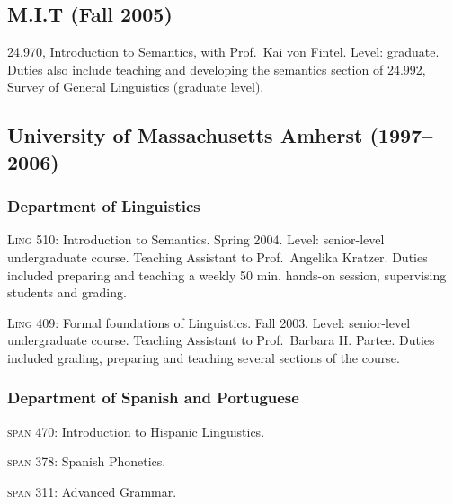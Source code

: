 \documentclass[11pt]{article}
\begin{document}


\subsection*{ M.I.T (Fall 2005)}

\textsc{24.970}, Introduction to Semantics, with Prof.\ Kai von
Fintel. Level: graduate. Duties also include teaching and developing
the semantics section of 24.992, Survey of General Linguistics
(graduate level).

\subsection*{University of Massachusetts Amherst (1997-- 2006)}

\subsubsection*{Department of Linguistics}

\textsc{Ling 510:} Introduction to Semantics. Spring 2004. Level:
senior-level undergraduate course. Teaching Assistant to Prof.\
Angelika Kratzer. Duties included preparing and teaching a weekly 50 min. hands-on session, supervising students and grading.

\textsc{Ling 409:} Formal foundations of Linguistics. Fall
2003. Level: senior-level undergraduate course. Teaching Assistant to
Prof.\ Barbara H. Partee. Duties included grading, preparing and teaching several sections of the course. 

\subsubsection*{Department of Spanish and Portuguese}

\textsc{span 470}: Introduction to Hispanic Linguistics.

\textsc{span 378}: Spanish Phonetics. 

\textsc{span 311}: Advanced Grammar. 
\end{document}
